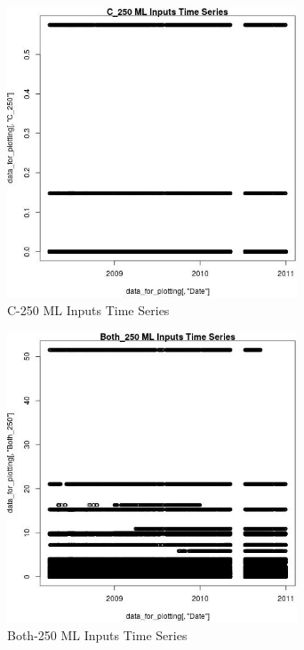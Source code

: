 \begin{figure} 
\centering  
\includegraphics[width=0.77\textwidth]{Code_Outputs/ML_input_report_ML_input_PM25_Step5_part_d_de_duplicated_aves_ML_input_C_250vDate.jpg} 
\caption{\label{fig:ML_input_report_ML_input_PM25_Step5_part_d_de_duplicated_aves_ML_inputC_250vDate}C-250 ML Inputs Time Series} 
\end{figure} 
 

\begin{figure} 
\centering  
\includegraphics[width=0.77\textwidth]{Code_Outputs/ML_input_report_ML_input_PM25_Step5_part_d_de_duplicated_aves_ML_input_Both_250vDate.jpg} 
\caption{\label{fig:ML_input_report_ML_input_PM25_Step5_part_d_de_duplicated_aves_ML_inputBoth_250vDate}Both-250 ML Inputs Time Series} 
\end{figure} 
 

